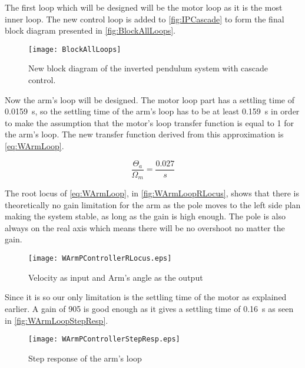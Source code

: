 The first loop which will be designed will be the motor loop as it is the most inner loop. The new control loop is added to \autoref{fig:IPCascade} to form the final block diagram presented in \autoref{fig:BlockAllLoops}.

\begin{figure}[htbp]
	\centering
	\texttt{[image: BlockAllLoops]}
	\caption{New block diagram of the inverted pendulum system with cascade control.}
	\label{fig:BlockAllLoops}
\end{figure}



Now the arm's loop will be designed. The motor loop part has a settling time of \SI{0.0159}{\second}, so the settling time of the arm's loop has to be at least \SI{0.159}{\second} in order to make the assumption that the motor's loop transfer function is equal to 1 for the arm's loop. The new transfer function derived from this approximation is \autoref{eq:WArmLoop}.

\begin{equation}\label{eq:WArmLoop}
	\frac{\Theta_a}{\Omega_m}=\frac{0.027}{s}
\end{equation}

The root locus of \autoref{eq:WArmLoop}, in \autoref{fig:WArmLoopRLocus}, shows that there is theoretically no gain limitation for the arm as the pole moves to the left side plan making the system stable, as long as the gain is high enough. The pole is also always on the real axis which means there will be no overshoot no matter the gain.

\begin{figure} [htbp] 
	\centering
	\texttt{[image: WArmPControllerRLocus.eps]}
	\caption{Velocity as input and Arm's angle as the output}
	\label{fig:WArmLoopRLocus}
\end{figure}

Since it is so our only limitation is the settling time of the motor as explained earlier. A gain of 905 is good enough as it gives a settling time of \SI{0.16}{\second} as seen in \autoref{fig:WArmLoopStepResp}.

\begin{figure} [htbp] 
	\centering
	\texttt{[image: WArmPControllerStepResp.eps]}
	\caption{Step response of the arm's loop}
	\label{fig:WArmLoopStepResp}
\end{figure}


